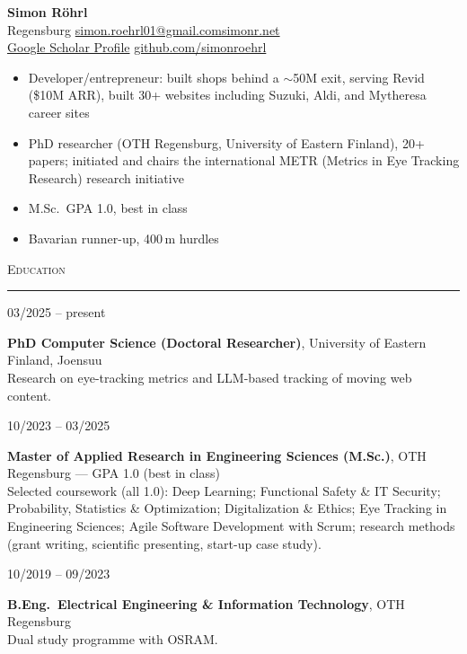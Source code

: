 \documentclass[10pt,a4paper]{article}
\newcommand{\cvsection}[1]{%
  \vspace{5pt}%
  {\large\scshape #1}\par
  \vspace{1pt}\hrule\vspace{4pt}%
}
\newlength{\datewidth}
\newcommand{\cventry}[2]{%
  \begin{minipage}[t]{\datewidth}\raggedright #1\end{minipage}%
  \hfill
  \begin{minipage}[t]{\dimexpr\textwidth-\datewidth-0.3cm\relax}#2\end{minipage}%
  \par\vspace{4pt}%
}
\begin{document}
\begin{center}
  {\LARGE\bfseries Simon Röhrl}\\[3pt]
  Regensburg \;\textbar\;
  \href{mailto:simon.roehrl01@gmail.com}{simon.roehrl01@gmail.com}\;\textbar\;\href{https://simonr.net}{simonr.net}\\
  \href{https://scholar.google.com/citations?user=UL63m84AAAAJ}{Google Scholar Profile} \;\textbar\; \href{https://github.com/simonroehrl}{github.com/simonroehrl}
\end{center}

\vspace{2pt}
\begin{itemize}
  \item Developer/entrepreneur: built shops behind a $\sim$\texteuro50M exit, serving Revid (\$10M ARR), built 30+ websites including Suzuki, Aldi, and Mytheresa career sites
  \item PhD researcher (OTH Regensburg, University of Eastern Finland), 20+ papers; initiated and chairs the international METR (Metrics in Eye Tracking Research) research initiative
  \item M.Sc.\ GPA 1.0, best in class
  \item Bavarian runner-up, 400\,m hurdles
\end{itemize}

\cvsection{Education}

\cventry{03/2025 -- present}{%
  \textbf{PhD Computer Science (Doctoral Researcher)}, University of Eastern Finland, Joensuu\\
  Research on eye-tracking metrics and LLM-based tracking of moving web content.}

\cventry{10/2023 -- 03/2025}{%
  \textbf{Master of Applied Research in Engineering Sciences (M.Sc.)}, OTH Regensburg --- GPA 1.0 (best in class)\\
  Selected coursework (all 1.0): Deep Learning; Functional Safety \& IT Security; Probability, Statistics \& Optimization; Digitalization \& Ethics; Eye Tracking in Engineering Sciences; Agile Software Development with Scrum; research methods (grant writing, scientific presenting, start-up case study).}

\cventry{10/2019 -- 09/2023}{%
  \textbf{B.Eng.\ Electrical Engineering \& Information Technology}, OTH Regensburg\\
  Dual study programme with OSRAM.}
\end{document}

